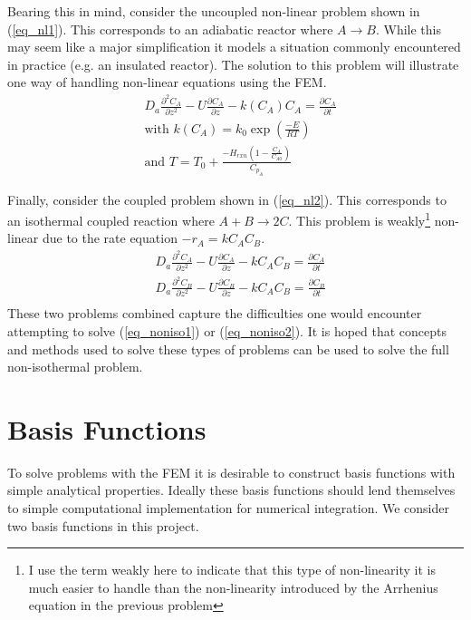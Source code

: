 \documentclass[11pt,fleqn]{article}
\theoremstyle{defstyle}
\begin{document}
Bearing this in mind, consider the uncoupled non-linear problem shown in (\ref{eq_nl1}). This corresponds to an adiabatic reactor where $A \rightarrow B$. While this may seem like a major simplification it models a situation commonly encountered in practice (e.g. an insulated reactor). The solution to this problem will illustrate one way of handling non-linear equations using the FEM.
\begin{equation}
\begin{aligned}
&D_a \frac{\partial^2 C_A}{\partial z^2} - U \frac{\partial C_A}{\partial z} - k(C_A)
C_A = \frac{\partial C_A}{\partial t} \\
& \text{with }k(C_A) = k_0 \exp(\frac{-E}{RT}) \\
& \text{and } T = T_0 + \frac{-H_{rxn} (1-\frac{C_A}{C_{A0}})}{C_{p_A}}
\end{aligned}
\label{eq_nl1}
\end{equation}  

Finally, consider the coupled problem shown in (\ref{eq_nl2}). This corresponds to an isothermal coupled reaction where $A + B \rightarrow 2C$. This problem is weakly\footnote{I use the term weakly here to indicate that this type of non-linearity it is much easier to handle than the non-linearity introduced by the Arrhenius equation in the previous problem} non-linear due to the rate equation $-r_A = kC_AC_B$.
\begin{equation}
\begin{aligned}
&D_a \frac{\partial^2 C_A}{\partial z^2} - U \frac{\partial C_A}{\partial z} - kC_AC_B 
= \frac{\partial C_A}{\partial t} \\
&D_a \frac{\partial^2 C_B}{\partial z^2} - U \frac{\partial C_B}{\partial z} - kC_AC_B 
= \frac{\partial C_B}{\partial t} \\
\end{aligned}
\label{eq_nl2}
\end{equation}
These two problems combined capture the difficulties one would encounter attempting to solve (\ref{eq_noniso1}) or (\ref{eq_noniso2}). It is hoped that concepts and methods used to solve these types of problems can be used to solve the full non-isothermal problem.

\section{Basis Functions}
To solve problems with the FEM it is desirable to construct basis functions with simple analytical properties. Ideally these basis functions should lend themselves to simple computational implementation for numerical integration. We consider two basis functions in this project. 
\end{document}
